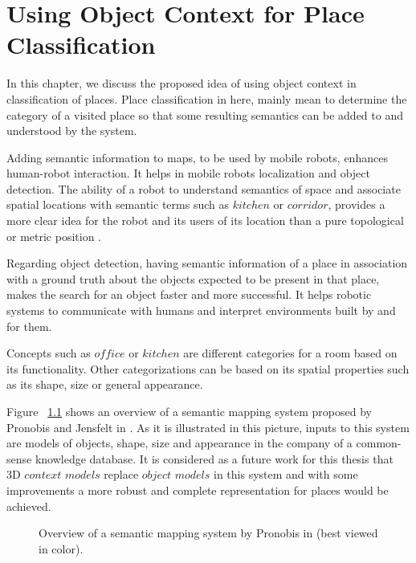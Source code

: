 \chapter{Using Object Context for Place Classification}
\label{UsingObjectContextforPlaceClassification.ch}

In this chapter, we discuss the proposed idea of using object context in classification of places.
Place classification in here, mainly mean to determine the category of a visited place so that some resulting semantics 
can be added to and understood by the system.

Adding semantic information to maps, to be used by mobile robots, enhances human-robot interaction.
It helps in mobile robots localization and object detection.
The ability of a robot to understand semantics of space and associate spatial locations with semantic terms 
such as $kitchen$ or $corridor$, provides a more clear idea for the robot and its users of its location than a pure 
topological or metric position \cite{pronobis2011phd}.   

Regarding object detection, having semantic information of a place in association with a ground truth about the objects expected
to be present in that place, makes the search for an object faster and more successful.
It helps robotic systems to communicate with humans and interpret environments built by and for them.

Concepts such as $office$ or $kitchen$ are different categories for a room based on its functionality.
Other categorizations can be  based on its spatial properties such as its shape, size or general appearance.

Figure ~\ref{semanticmapping.figure} shows an overview of a semantic mapping system proposed by Pronobis and Jensfelt in \cite{pronobis2011phd}.
As it is illustrated in this picture, inputs to this system are models of objects, shape, size and appearance in the company of a 
common-sense knowledge database.
It is considered as a future work for this thesis that 3D $context$ $models$ replace $object$ $models$ in this system and with some improvements 
a more robust and complete representation for places would be achieved.

\begin{figure}[t]
  \caption[Overview of a semantic mapping system]
  {Overview of a semantic mapping system by Pronobis in \cite{pronobis2011phd}(best viewed in color).}
  \label{semanticmapping.figure}
\end{figure}

